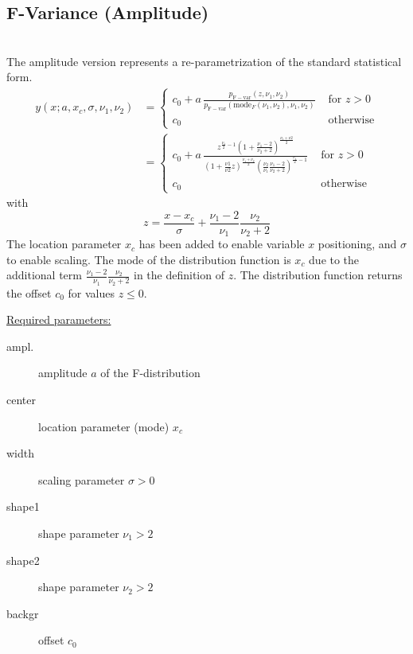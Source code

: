 \subsection{F-Variance (Amplitude)} ~\\
\label{sec:FVarianceAmplitude}
The amplitude version represents a re-parametrization of the standard statistical form.
\begin{align}
y(x;a,x_c,\sigma,\nu_1,\nu_2)
&=
\begin{cases}
c_0+a\,\frac{p_\mathrm{F-var}(z,\nu_1,\nu_2)}{p_\mathrm{F-var}(\mathrm{mode}_F(\nu_1,\nu_2),\nu_1,\nu_2)}  & \mbox{ for } z>0\\
c_0 & \mbox{ otherwise}
\end{cases} \nonumber\\
&=
\begin{cases}
c_0+a\,\frac{z^{\frac{\nu_1}{2}-1}\left(1+\frac{\nu_1-2}{\nu_2+2}\right)^{\frac{\nu_1+\nu2}{2}}}{\left(1+\frac{\nu1}{\nu2}z\right)^{\frac{\nu_1+\nu_2}{2}}\left(\frac{\nu_2}{\nu_1}\frac{\nu_1-2}{\nu_2+2}\right)^{\frac{\nu_1}{2}-1}}   & \mbox{ for } z>0\\
c_0 & \mbox{ otherwise}
\end{cases}
\end{align}
with
\begin{equation}
z = \frac{x-x_c}{\sigma}+\frac{\nu_1-2}{\nu_1}\frac{\nu_2}{\nu_2+2}
\end{equation}
The location parameter $x_c$ has been added to enable variable $x$ positioning, and $\sigma$
to enable scaling. The mode of the distribution function is $x_c$ due to the additional term
$\frac{\nu_1-2}{\nu_1}\frac{\nu_2}{\nu_2+2}$ in the definition of $z$. The distribution
function returns the offset $c_0$ for values $z\leq 0$.

\vspace{5mm}

\underline{Required parameters:}
\begin{description}
    \item[ampl.] amplitude $a$ of the F-distribution
    \item[center] location parameter (mode) $x_c$
    \item[width] scaling parameter $\sigma>0$
    \item[shape1] shape parameter $\nu_1>2$
    \item[shape2] shape parameter $\nu_2>2$
    \item[backgr] offset $c_0$
\end{description}

